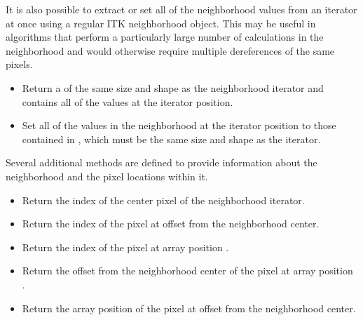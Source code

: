 {\begin{itemize}
\end{itemize}

It is also possible to extract or set all of the neighborhood values from an iterator
at once using a regular ITK neighborhood object.  This may be useful in
algorithms that perform a particularly large number of calculations in the
neighborhood and would otherwise require multiple dereferences of the same pixels.

\begin{itemize}

\item \textbf{} Return a
 of the same size and shape as the neighborhood
iterator and contains all of the values at the iterator position.

\item \textbf{} Set all
of the values in the neighborhood at the iterator position to those contained
in , which must be the same size and shape as the iterator.

\end{itemize}

Several additional methods are defined to provide information about the
neighborhood and the pixel locations within it.

\begin{itemize}

\item \textbf{} Return the 
index of the center pixel of the neighborhood iterator.

\item \textbf{} Return the
 index of the pixel at offset  from the neighborhood center.

\item \textbf{} Return the
 index of the pixel at array position .

\item \textbf{}  Return the offset
from the neighborhood center of the pixel at array position .

\item \textbf{} Return
the array position of the pixel at offset  from the neighborhood center.


\end{itemize}}

